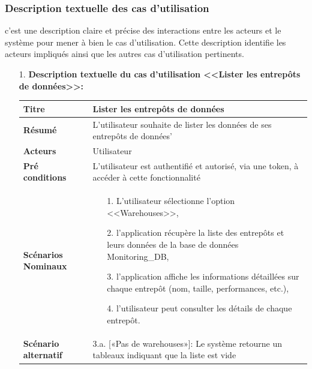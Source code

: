 \subsubsection{Description textuelle des cas d'utilisation}
\par c'est une description claire et précise des interactions entre les acteurs et le système pour mener à bien le cas d'utilisation. Cette description identifie les acteurs impliqués ainsi que les autres cas d'utilisation pertinents\cite{descp}.
\begin{enumerate}
    \item[1.] \textbf{Description textuelle du cas d'utilisation <<Lister les entrepôts de données>>:}
    \begin{table}[H]
        \centering
            \begin{tabular}{|p{3.5cm}|p{12cm}|}
                \hline \textbf{Titre} &  Lister les entrepôts de données \\
                \hline \textbf{Résumé} & L'utilisateur souhaite de lister les données de ses entrepôts de données' \\
                \hline \textbf{Acteurs} & Utilisateur\\
                \hline \textbf{Pré conditions }& L'utilisateur est authentifié et autorisé, via une token, à accéder à cette fonctionnalité\\
                \hline \textbf{Scénarios Nominaux} &
                    \begin{enumerate}
                        \item [1.] L'utilisateur sélectionne l'option <<Warehouses>>,
                        \item [2.] l'application récupère la liste des entrepôts et leurs données de la base de données Monitoring\_DB,
                        \item [3.] l'application affiche les informations détaillées sur chaque entrepôt (nom, taille, performances, etc.),
                        \item [4.] l'utilisateur peut consulter les détails de chaque entrepôt.      
                    \end{enumerate}\\
                        \hline \textbf{Scénario alternatif} & 
                   3.a. \hspace{0.3cm} [«Pas de warehouses»]: Le système retourne un tableaux indiquant que la liste est vide \newline                             \\

\end{tabular}
\end{table}
\end{enumerate}
